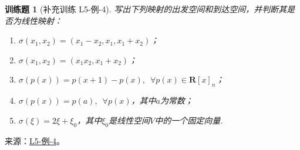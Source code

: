 \documentclass[UTF8,12pt,a4paper,fontset=fandol]{ctexart}
\newtheorem{exercise}{训练题}[section]
\begin{document}
\begin{exercise}[补充训练 L5-例-4]\label{prob:L5-例-4}
写出下列映射的出发空间和到达空间，并判断其是否为线性映射：
    \begin{enumerate}
        \item $\sigma(x_1,x_2)=(x_1-x_2,x_1,x_1+x_2)$；

        \item $\sigma(x_1,x_2)=(x_1x_2,x_1+x_2)$；

        \item $\sigma(p(x))=p(x+1)-p(x),\enspace\forall p(x) \in \mathbf{R}[x]_n$；

        \item $\sigma(p(x))=p(a),\enspace\forall p(x)$，其中$a$为常数；

        \item $\sigma(\xi)=2\xi+\xi_0$，其中$\xi_0$是线性空间$V$中的一个固定向量.
    \end{enumerate}
\end{exercise}
\noindent 来源：\href{https://github.com/yhwu-is/Linear-Algebra-Left-Undone/blob/new/%E8%AE%B2%E4%B9%89/%E4%B8%93%E9%A2%98/5%20%E7%BA%BF%E6%80%A7%E6%98%A0%E5%B0%84.tex}{L5-例-4}。
\end{document}
